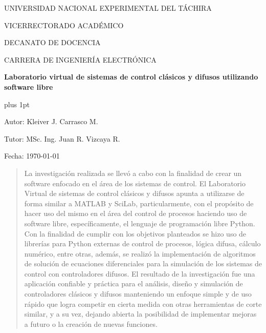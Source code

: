 \begin{center}
	\begin{spacing}{1}
		UNIVERSIDAD NACIONAL EXPERIMENTAL DEL TÁCHIRA
		
		VICERRECTORADO ACADÉMICO
		
		DECANATO DE DOCENCIA
		
		CARRERA DE INGENIERÍA ELECTRÓNICA
	
		\vspace{35pt}

		{\large \textbf{Laboratorio virtual de sistemas de control clásicos y difusos utilizando software libre}\par}
	
	\end{spacing}
\end{center}

\vspace{25pt}

\begin{flushright}
	\begin{spacing}{1}
		\parskip=0pt plus 1pt

		Autor: Kleiver J. Carrasco M.

		Tutor: MSc. Ing. Juan R. Vizcaya R.

		Fecha: \monthyearFecha\today
		
	\end{spacing}	
\end{flushright}

\vspace{15pt}

\begin{abstract}
	La investigación realizada se llevó a cabo con la finalidad de crear un software enfocado en el área de los sistemas de control. El Laboratorio Virtual de sistemas de control clásicos y difusos apunta a utilizarse de forma similar a MATLAB y SciLab, particularmente, con el propósito de hacer uso del mismo en el área del control de procesos haciendo uso de software libre, específicamente, el lenguaje de programación libre Python. Con la finalidad de cumplir con los objetivos planteados se hizo uso de librerías para Python externas de control de procesos, lógica difusa, cálculo numérico, entre otras, además, se realizó la implementación de algoritmos de solución de ecuaciones diferenciales para la simulación de los sistemas de control con controladores difusos. El resultado de la investigación fue una aplicación confiable y práctica para el análisis, diseño y simulación de controladores clásicos y difusos manteniendo un enfoque simple y de uso rápido que logra competir en cierta medida con otras herramientas de corte similar, y a su vez, dejando abierta la posibilidad de implementar mejoras a futuro o la creación de nuevas funciones.
\end{abstract}

